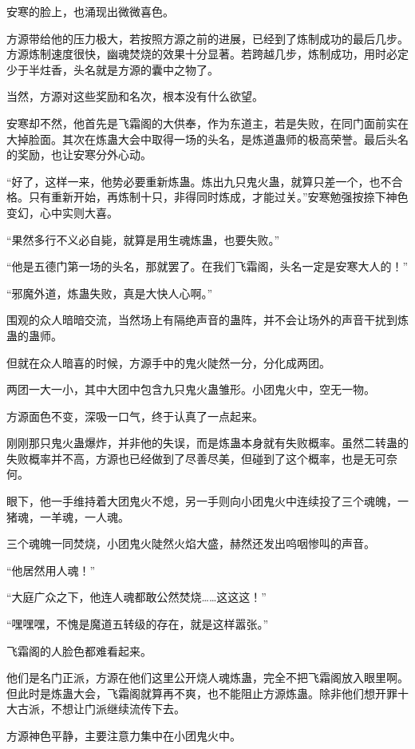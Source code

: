 \begin{this_body}
安寒的脸上，也涌现出微微喜色。

方源带给他的压力极大，若按照方源之前的进展，已经到了炼制成功的最后几步。方源炼制速度很快，幽魂焚烧的效果十分显著。若跨越几步，炼制成功，用时必定少于半炷香，头名就是方源的囊中之物了。

当然，方源对这些奖励和名次，根本没有什么欲望。

安寒却不然，他首先是飞霜阁的大供奉，作为东道主，若是失败，在同门面前实在大掉脸面。其次在炼蛊大会中取得一场的头名，是炼道蛊师的极高荣誉。最后头名的奖励，也让安寒分外心动。

“好了，这样一来，他势必要重新炼蛊。炼出九只鬼火蛊，就算只差一个，也不合格。只有重新开始，再炼制十只，非得同时炼成，才能过关。”安寒勉强按捺下神色变幻，心中实则大喜。

“果然多行不义必自毙，就算是用生魂炼蛊，也要失败。”

“他是五德门第一场的头名，那就罢了。在我们飞霜阁，头名一定是安寒大人的！”

“邪魔外道，炼蛊失败，真是大快人心啊。”

围观的众人暗暗交流，当然场上有隔绝声音的蛊阵，并不会让场外的声音干扰到炼蛊的蛊师。

但就在众人暗喜的时候，方源手中的鬼火陡然一分，分化成两团。

两团一大一小，其中大团中包含九只鬼火蛊雏形。小团鬼火中，空无一物。

方源面色不变，深吸一口气，终于认真了一点起来。

刚刚那只鬼火蛊爆炸，并非他的失误，而是炼蛊本身就有失败概率。虽然二转蛊的失败概率并不高，方源也已经做到了尽善尽美，但碰到了这个概率，也是无可奈何。

眼下，他一手维持着大团鬼火不熄，另一手则向小团鬼火中连续投了三个魂魄，一猪魂，一羊魂，一人魂。

三个魂魄一同焚烧，小团鬼火陡然火焰大盛，赫然还发出呜咽惨叫的声音。

“他居然用人魂！”

“大庭广众之下，他连人魂都敢公然焚烧……这这这！”

“嘿嘿嘿，不愧是魔道五转级的存在，就是这样嚣张。”

飞霜阁的人脸色都难看起来。

他们是名门正派，方源在他们这里公开烧人魂炼蛊，完全不把飞霜阁放入眼里啊。但此时是炼蛊大会，飞霜阁就算再不爽，也不能阻止方源炼蛊。除非他们想开罪十大古派，不想让门派继续流传下去。

方源神色平静，主要注意力集中在小团鬼火中。


\end{this_body}
